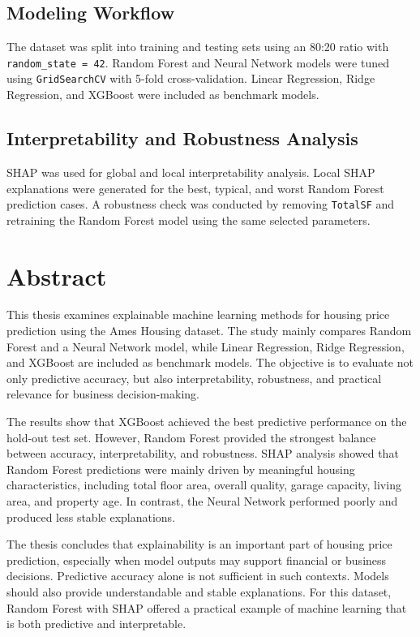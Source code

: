 \documentclass[12pt,a4paper,oneside,openany]{book}
\begin{document}
\section{Modeling Workflow}

The dataset was split into training and testing sets using an 80:20 ratio with \texttt{random\_state = 42}. Random Forest and Neural Network models were tuned using \texttt{GridSearchCV} with 5-fold cross-validation. Linear Regression, Ridge Regression, and XGBoost were included as benchmark models.

\section{Interpretability and Robustness Analysis}

SHAP was used for global and local interpretability analysis. Local SHAP explanations were generated for the best, typical, and worst Random Forest prediction cases. A robustness check was conducted by removing \texttt{TotalSF} and retraining the Random Forest model using the same selected parameters.






\clearpage

\chapter*{Abstract}


This thesis examines explainable machine learning methods for housing price prediction using the Ames Housing dataset. The study mainly compares Random Forest and a Neural Network model, while Linear Regression, Ridge Regression, and XGBoost are included as benchmark models. The objective is to evaluate not only predictive accuracy, but also interpretability, robustness, and practical relevance for business decision-making.

The results show that XGBoost achieved the best predictive performance on the hold-out test set. However, Random Forest provided the strongest balance between accuracy, interpretability, and robustness. SHAP analysis showed that Random Forest predictions were mainly driven by meaningful housing characteristics, including total floor area, overall quality, garage capacity, living area, and property age. In contrast, the Neural Network performed poorly and produced less stable explanations.

The thesis concludes that explainability is an important part of housing price prediction, especially when model outputs may support financial or business decisions. Predictive accuracy alone is not sufficient in such contexts. Models should also provide understandable and stable explanations. For this dataset, Random Forest with SHAP offered a practical example of machine learning that is both predictive and interpretable.
\end{document}
